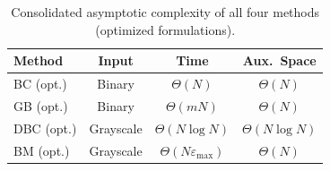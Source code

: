 \begin{table}[h]
\centering
\caption{Consolidated asymptotic complexity of all four methods (optimized formulations).}
\label{tab:all_complexity}
\begin{tabular}{lccc}
\hline
\textbf{Method} & \textbf{Input} & \textbf{Time} & \textbf{Aux.\ Space} \\
\hline
BC  (opt.) & Binary    & $\Theta(N)$           & $\Theta(N)$        \\
GB  (opt.) & Binary    & $\Theta(mN)$          & $\Theta(N)$        \\
DBC (opt.) & Grayscale & $\Theta(N \log N)$    & $\Theta(N \log N)$ \\
BM  (opt.) & Grayscale & $\Theta(N\varepsilon_{\max})$ & $\Theta(N)$ \\
\hline
\end{tabular}
\end{table}